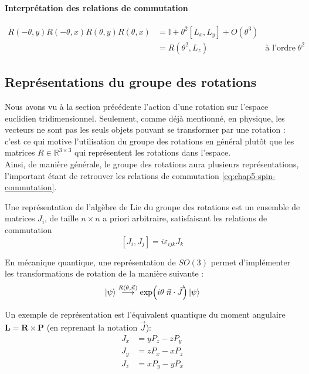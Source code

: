 \documentclass[../notesdecours.tex]{subfiles}
\begin{document}
\paragraph{Interprétation des relations de commutation}

{\color{red}{je ne réussis pas à obtenir les mêmes termes, et je ne comprends pas l'interprétation. J'ai trouvé un équivalent  en mécanique classique dans le Cohen-Tannoudji.}}
$$
\begin{array}{llr}
    R(-\theta, y)R(-\theta, x)R(\theta, y)R(\theta, x) &= \mathbb{I} + \theta^2\left[L_x, L_y\right] + O(\theta^3)& \\
    &= R(\theta^2, L_z) & \text{à l'ordre} \; \theta^2
\end{array}
$$


\subsection{Représentations du groupe des rotations}
Nous avons vu à la section précédente l'action d'une rotation sur l'espace euclidien tridimensionnel. Seulement, comme déjà mentionné, en physique, les vecteurs ne sont pas les seuls objets pouvant se transformer par une rotation : c'est ce qui motive l'utilisation du groupe des rotations en général plutôt que les matrices $R\in \mathbb{R}^{3\times 3}$ qui représentent les rotations dans l'espace. \\

Ainsi, de manière générale, le groupe des rotations aura plusieurs représentations, l'important étant de retrouver les relations de commutation \ref{eq:chap5-spin-commutation}.

\begin{definition}
    Une représentation de l'algèbre de Lie du groupe des rotations est un ensemble de matrices $J_i$, de taille $n\times n$ a priori arbitraire, satisfaisant les relations de commutation $$ [J_i, J_j] = i\varepsilon_{ijk} J_k$$
\end{definition}

En mécanique quantique, une représentation de $SO(3)$ permet d'implémenter les transformations de rotation de la manière suivante :
\begin{equation} \label{eq:chap5-spin-transformation}
    \ket \psi \stackrel{R(\theta,\vec n)}{\longrightarrow} \exp(i\theta \; \vec n \cdot \vec J) \ket \psi
\end{equation}

Un exemple de représentation est l'équivalent quantique du moment angulaire $\mathbf L= \mathbf{R} \times \mathbf{P}$ (en reprenant la notation $\vec J$):
$$
\begin{array}{ll}
    J_x &= yP_z - zP_y \\
    J_y &= zP_x - xP_z \\
    J_z &= xP_y - yP_x
\end{array}
$$
\end{document}
